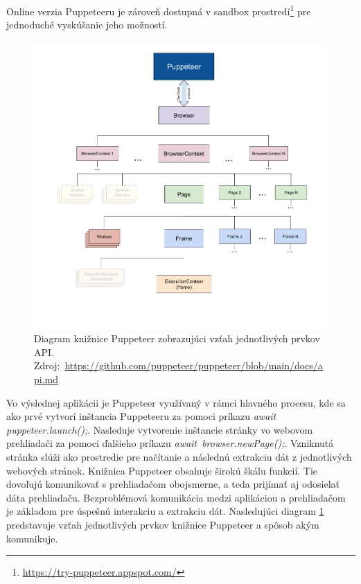 Online verzia Puppeteeru je zároveň dostupná v sandbox prostredí\footnote{\url{https://try-puppeteer.appspot.com/}} pre jednoduché vyskúšanie jeho možností.

\bigskip

\begin{figure}[hbt]
	\centering
	\includegraphics[width=1\textwidth]{obrazky-figures/diagram.png}
	\caption{Diagram knižnice Puppeteer zobrazujúci vzťah jednotlivých prvkov API.\\ \mbox{Zdroj: \url{https://github.com/puppeteer/puppeteer/blob/main/docs/api.md}}}
	\label{diagram}
\end{figure}

Vo výslednej aplikácii je Puppeteer využívaný v rámci hlavného procesu, kde sa ako prvé vytvorí inštancia Puppeteeru za pomoci príkazu \textit{await puppeteer.launch();}. Nasleduje vytvorenie inštancie stránky vo webovom prehliadači za pomoci ďalšieho príkazu \mbox{\textit{await browser.newPage();}}. Vzniknutá stránka slúži ako prostredie pre načítanie a následnú extrakciu dát z jednotlivých webových stránok. Knižnica Puppeteer obsahuje širokú škálu funkcií. Tie dovoľujú komunikovať s prehliadačom obojsmerne, a teda prijímať aj odosielať dáta prehliadaču. Bezproblémová komunikácia medzi aplikáciou a prehliadačom je základom pre úspešnú interakciu a extrakciu dát. Nasledujúci diagram \ref{diagram} predstavuje vzťah jednotlivých prvkov knižnice Puppeteer a spôsob akým komunikuje.

